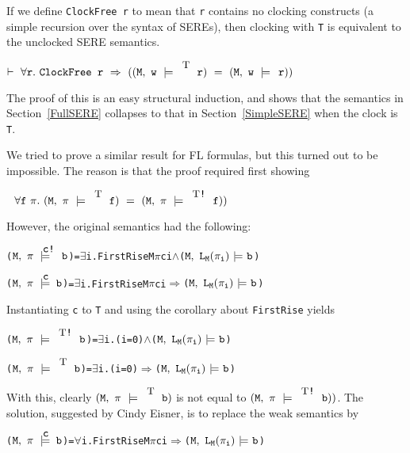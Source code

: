 \documentclass{llncs}
\newcommand{\And}{\(\wedge\)}
\newcommand{\Imp}{\(\Rightarrow\)}
\newcommand{\Forall}{\(\forall\)}
\newcommand{\Exists}{\(\exists\)}
\newcommand{\T}{\texttt{\small\rm{T}}}
\renewcommand{\Pi}{\(\pi\)}
\newcommand{\BSem}[3]{(\(\tt#1,~#2~{\models}~#3\))}
\newcommand{\sSem}[4]{(\tt{#1,~#2~\models^{\hspace*{-2.3mm}\raisebox{1mm}{\tt#3}}~#4})}
\renewcommand{\c}{{\hspace*{2.5mm}}}
\newcommand{\FSem}[4]{(\(\tt{#1,~#2~\models^{\hspace*{-2.3mm}\raisebox{1mm}{\tt#3}}~#4}\))}
\newcommand{\fSem}[4]{(\tt{#1,~#2~\models^{\hspace*{-2.3mm}\raisebox{1mm}{\tt#3}}~#4})}
\newcommand{\FBool}[1]{#1}
\newcommand{\weakClock}[1]{#1}
\newcommand{\strongClock}[1]{#1!}
\newcommand{\pathEl}[2]{#1_{#2}}
\newcommand{\lNoHat}[1]{{\texttt{L}}_{#1}}
\renewcommand{\t}[1]{\texttt{#1}}
\begin{document}
If we define \t{ClockFree~r} to mean
that \t{r} contains no clocking constructs (a simple recursion over the syntax of SEREs),
then clocking with \T{} is equivalent to the unclocked SERE semantics.

\medskip

$\vdash~\forall{\t{r}}.~\t{ClockFree~r}~\Rightarrow~(\sSem{M}{w}{\T}{r}~=~\sSem{M}{w}{\c}{r})$

\medskip

The proof of this is an easy structural induction, and shows that the semantics in Section~\ref{FullSERE}
collapses to that in Section~\ref{SimpleSERE} when the clock is \T.

We tried to prove a similar result for FL formulas, but this turned out to be impossible.
The reason is that the proof required first showing


\medskip

$~~\forall{\t{f}}~\pi.~\fSem{M}{\pi}{\T}{f}~=~\sSem{M}{\pi}{\T\texttt{!}}{f})$

\medskip

However, the original semantics had the following:

{\begin{alltt}
  {\FSem{M}{{\pi}}{{\strongClock{c}}}{\FBool{b}}} = {\Exists}i. FirstRise M {\Pi} c i {\And} {\BSem{M}{\lNoHat{M}(\pathEl{{\pi}}{i})}{b}}

  {\FSem{M}{{\pi}}{{\weakClock{c}}}{{\FBool{b}}}}  = {\Exists}i. FirstRise M {\Pi} c i {\Imp} {\BSem{M}{\lNoHat{M}(\pathEl{{\pi}}{i})}{b}}
\end{alltt}}


Instantiating \t{c} to \T{} and using the corollary about \t{FirstRise} yields


{\begin{alltt}
  {\FSem{M}{{\pi}}{{\strongClock{\T}}}{\FBool{b}}} = {\Exists}i. (i=0) {\And} {\BSem{M}{\lNoHat{M}(\pathEl{{\pi}}{i})}{b}}

  {\FSem{M}{{\pi}}{{\weakClock{\T}}}{{\FBool{b}}}}  = {\Exists}i. (i=0) {\Imp} {\BSem{M}{\lNoHat{M}(\pathEl{{\pi}}{i})}{b}}
\end{alltt}}

With this, clearly $\fSem{M}{\pi}{\T}{\FBool{b}}$ is not equal to $\sSem{M}{\pi}{\T\texttt{!}}{\FBool{b}})$.
The solution, suggested by Cindy Eisner, is to replace the weak semantics by


{\begin{alltt}
  {\FSem{M}{{\pi}}{{\weakClock{c}}}{{\FBool{b}}}}  = {\Forall}i. FirstRise M {\Pi} c i {\Imp} {\BSem{M}{\lNoHat{M}(\pathEl{{\pi}}{i})}{b}}
\end{alltt}}
\end{document}
